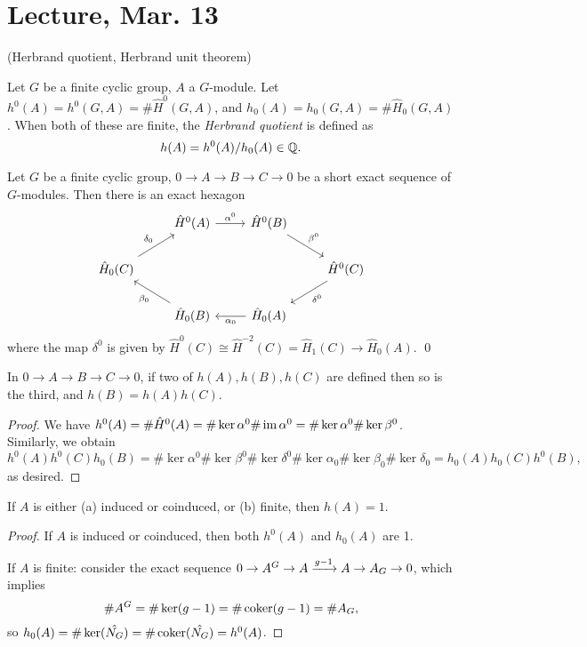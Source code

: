 \documentclass[11pt]{amsart}
\begin{document}
\section{Lecture, Mar. 13}

(Herbrand quotient, Herbrand unit theorem)


\begin{defn}
    Let $G$ be a finite cyclic group, $A$ a $G$-module. Let $h^0(A) = h^0(G,A) = \#\hat{H}^0(G,A)$, and $h_0(A) = h_0(G,A) = \#\hat{H}_0(G,A)$. When both of these are finite, the \emph{Herbrand quotient} is defined as
    \[h(A) = h^0(A)/h_0(A)\in \mathbb{Q}.\]
\end{defn}


\begin{prop}
    Let $G$ be a finite cyclic group, $0\to A\to B\to C\to 0$ be a short exact sequence of $G$-modules. Then there is an exact hexagon
\[\begin{tikzcd}
	& {\hat{H}^0(A)} & {\hat{H}^0(B)} \\
	{\hat{H}_0(C)} &&& {\hat{H}^0(C)} \\
	& {\hat{H}_0(B)} & {\hat{H}_0(A)}
	\arrow[from=1-2, to=1-3, "\alpha^0"]
	\arrow[from=1-3, to=2-4, "\beta^0"]
	\arrow[from=2-4, to=3-3, "\delta^0"]
	\arrow[from=3-3, to=3-2, "\alpha_0"]
	\arrow[from=3-2, to=2-1, "\beta_0"]
	\arrow[from=2-1, to=1-2, "\delta_0"]
\end{tikzcd}\]
where the map $\delta^0$ is given by $\hat{H}^0(C) \cong \hat{H}^{-2}(C) = \hat{H}_{1}(C) \to \hat{H}_0(A)$. \qed
\end{prop}

\begin{cor}
    In $0\to A\to B\to C\to 0$, if two of $h(A),h(B),h(C)$ are defined then so is the third, and $h(B) = h(A)h(C)$.
\end{cor}

\begin{proof}
    We have $h^0(A) = \# \hat{H}^0(A) = \# \ker\alpha^0 \# \operatorname{im} \alpha^0 = \#\ker\alpha^0\#\ker\beta^0$. Similarly, we obtain
    \[h^0(A) h^0(C) h_0(B) = \#\ker\alpha^0\#\ker\beta^0\#\ker\delta^0\#\ker\alpha_0\#\ker\beta_0\#\ker\delta_0 = h_0(A) h_0(C) h^0(B),\]
    as desired.
\end{proof}


\begin{cor}
    If $A$ is either (a) induced or coinduced, or (b) finite, then $h(A) = 1$.
\end{cor}

\begin{proof}
    If $A$ is induced or coinduced, then both $h^0(A)$ and $h_0(A)$ are 1.

    If $A$ is finite: consider the exact sequence $0\to A^G\to A \xrightarrow{g-1} A \to A_G \to 0$, which implies
    \[\# A^G = \#\ker(g-1) = \#\operatorname{coker}(g-1) = \# A_G,\]
    so $h_0(A) = \#\ker(\hat{N_G}) = \#\operatorname{coker}(\hat{N_G}) = h^0(A)$.
\end{proof}
\end{document}
